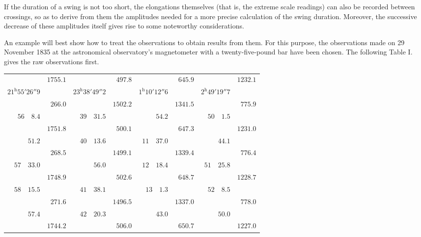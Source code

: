 If the duration of a swing is not too short, the elongations themselves (that is, the extreme scale readings) can also be recorded between crossings, so as to derive from them the amplitudes needed for a more precise calculation of the swing duration. Moreover, the successive decrease of these amplitudes itself gives rise to some noteworthy considerations.

An example will best show how to treat the observations to obtain results from them. For this purpose, the observations made on 29 November 1835 at the astronomical observatory’s magnetometer with a twenty-five-pound bar have been chosen. The following Table I. gives the raw observations first.

\begin{center}
\begingroup\fontsize{9}{11}\selectfont\setlength{\tabcolsep}{2pt}
\begin{tabular}{r|r||r|r||r|r||r|r}
& $1755.1$ && $497.8$ && $645.9$ && $1232.1$ \\[-4pt]
$21^{\mathrm{h}}55'26''9$ && $23^{\mathrm{h}}38'49''2$ && $1^{\mathrm{h}}10'12''6$ && $2^{\mathrm{h}}49'19''7$ & \\[-4pt]
& $266.0$ && $1502.2$ && $1341.5$ && $775.9$ \\[-4pt]
$56\quad8.4$ && $39\quad31.5$ && $54.2$ && $50\quad1.5$ & \\[-4pt]
& $1751.8$ && $500.1$ && $647.3$ && $1231.0$ \\[-4pt]
$51.2$ && $40\quad13.6$ && $11\quad37.0$ && $44.1$ & \\[-4pt]
& $268.5$ && $1499.1$ && $1339.4$ && $776.4$ \\[-4pt]
$57\quad33.0$ && $56.0$ && $12\quad18.4$ && $51\quad25.8$ & \\[-4pt]
& $1748.9$ && $502.6$ && $648.7$ && $1228.7$ \\[-4pt]
$58\quad15.5$ && $41\quad38.1$ && $13\quad1.3$ && $52\quad8.5$ & \\[-4pt]
& $271.6$ && $1496.5$ && $1337.0$ && $778.0$ \\[-4pt]
$57.4$ && $42\quad20.3$ && $43.0$ && $50.0$ & \\[-4pt]
& $1744.2$ && $506.0$ && $650.7$ && $1227.0$
\end{tabular}\endgroup
\end{center}


